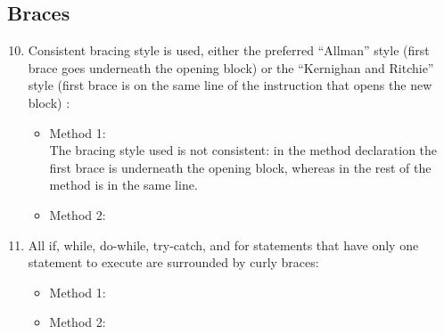 \subsection{Braces}
\begin{enumerate}
	\setcounter{enumi}{9}
	\item Consistent bracing style is used, either the preferred “Allman” style (first brace goes underneath the opening block) or the “Kernighan and Ritchie” style (first brace is on the same line of the instruction that opens the new block) :
	\begin{itemize}
		\item Method 1: \xmark \\
		The bracing style used is not consistent: in the method declaration the first brace is underneath the opening block, whereas in the rest of the method is in the same line.
		\item Method 2:
	\end{itemize}
	\item All if, while, do-while, try-catch, and for statements that have only one statement to execute are surrounded by curly braces:
	\begin{itemize}
		\item Method 1: \cmark
		\item Method 2: 
	\end{itemize}
\end{enumerate}